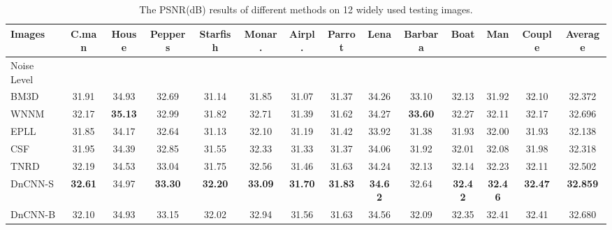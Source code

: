 \documentclass[journal]{IEEEtran}
\begin{document}
\begin{table*}[htbp]\caption{The PSNR(dB) results of different  methods on 12 widely used testing images.}
\center
\begin{tabular}{|l|c|c|c|c|c|c|c|c|c|c|c|c|c|}
  \hline
Images & C.man & House & Peppers & Starfish & Monar. & Airpl. & Parrot & Lena & Barbara & Boat & Man & Couple & Average \\ \hline \hline
    Noise Level & \multicolumn{13}{c|}{}   \\ \hline
    BM3D~\cite{dabov2007image} & 31.91 & 34.93 & 32.69 & 31.14 & 31.85 & 31.07 & 31.37 & 34.26 & 33.10 & 32.13 & 31.92 & 32.10 & 32.372  \\\hline
    WNNM~\cite{gu2014weighted}& 32.17 & \textbf{35.13} & 32.99 & 31.82 & 32.71 & 31.39 & 31.62 & 34.27 & \textbf{33.60} & 32.27 & 32.11 & 32.17 &  32.696  \\\hline
     EPLL~\cite{zoran2011learning}& 31.85 & 34.17 & 32.64 & 31.13 & 32.10 & 31.19 & 31.42 & 33.92 & 31.38 & 31.93 & 32.00 & 31.93 & 32.138   \\\hline
     CSF~\cite{schmidt2014shrinkage}& 31.95 & 34.39 & 32.85 & 31.55 & 32.33 & 31.33 & 31.37 & 34.06 & 31.92 & 32.01 & 32.08 & 31.98 &  32.318  \\\hline
     TNRD~\cite{chen2015trainable}& 32.19 & 34.53 & 33.04 & 31.75 & 32.56 & 31.46 & 31.63 & 34.24 & 32.13 & 32.14 & 32.23 & 32.11 & 32.502  \\\hline
     DnCNN-S& \textbf{32.61} & 34.97 & \textbf{33.30} & \textbf{32.20} & \textbf{33.09} & \textbf{31.70} & \textbf{31.83} & \textbf{34.62} & 32.64 & \textbf{32.42} & \textbf{32.46} & \textbf{32.47} &  \textbf{32.859}  \\\hline
     DnCNN-B& 32.10 & 34.93 & 33.15 & 32.02 & 32.94 & 31.56 & 31.63 & 34.56 & 32.09 & 32.35 & 32.41 & 32.41 &  32.680  \\\hline\hline



\end{tabular}
\end{table*}
\end{document}
